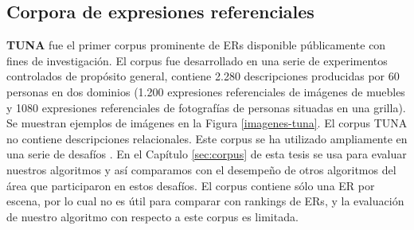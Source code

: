 %



\subsection{Corpora de expresiones referenciales}
\label{sec:corpus2}
\label{sec:corpusTUNA}


{\bf TUNA} \cite{tuna-corpus} fue el primer corpus prominente de ERs disponible p\'ublicamente con fines de investigaci\'on. El corpus fue desarrollado en una serie de experimentos controlados de prop\'osito general, contiene 2.280 descripciones producidas por 60 personas en dos dominios (1.200 expresiones referenciales de im\'agenes de muebles y 1080 expresiones referenciales de fotograf\'ias de personas situadas en una grilla). Se muestran ejemplos de im\'agenes en la Figura \ref{imagenes-tuna}. El corpus TUNA no contiene descripciones relacionales. Este corpus se ha utilizado ampliamente en una serie de desaf\'ios \cite{gatt09}. En el Cap\'itulo \ref{sec:corpus} de esta tesis se usa para evaluar nuestros algoritmos y as\'i comparamos con el desempe\~no de otros algoritmos del \'area que participaron en estos desaf\'ios. El corpus contiene s\'olo una ER por escena, por lo cual no es \'util para comparar con rankings de ERs, y la evaluaci\'on de nuestro algoritmo con respecto a este corpus es limitada.\\


